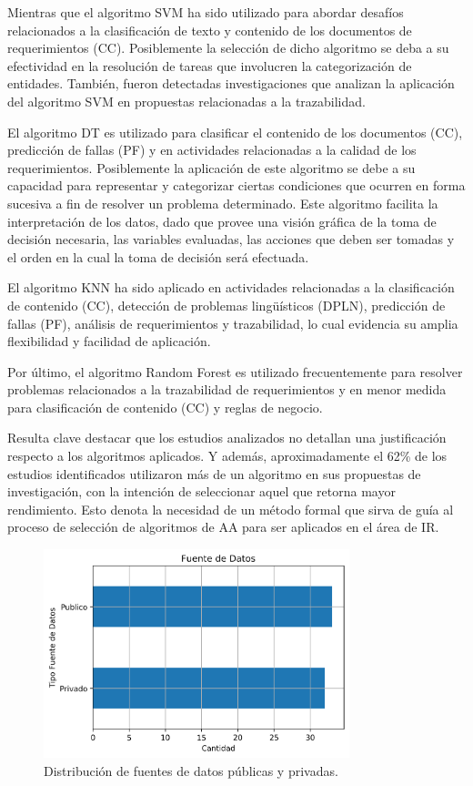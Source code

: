 \documentclass[journal]{IEEEtran}
\begin{document}
Mientras que el algoritmo SVM ha sido utilizado para abordar desafíos relacionados a la clasificación de texto y contenido de los documentos de requerimientos (CC). Posiblemente la selección de dicho algoritmo se deba a su efectividad en la resolución de tareas que involucren la categorización de entidades. También, fueron detectadas investigaciones que analizan la aplicación del algoritmo SVM en propuestas relacionadas a la trazabilidad. 

El algoritmo DT es utilizado para clasificar el contenido de los documentos (CC), predicción de fallas (PF) y en actividades relacionadas a la calidad de los requerimientos. Posiblemente la aplicación de este algoritmo se debe a su capacidad para representar y categorizar ciertas condiciones que ocurren en forma sucesiva a fin de resolver un problema determinado. Este algoritmo facilita la interpretación de los datos, dado que provee una visión gráfica de la toma de decisión necesaria, las variables evaluadas, las acciones que deben ser tomadas y el orden en la cual la toma de decisión será efectuada. 

El algoritmo KNN ha sido aplicado en actividades relacionadas a la clasificación de contenido (CC), detección de problemas lingüísticos (DPLN), predicción de fallas (PF), análisis de requerimientos y trazabilidad, lo cual evidencia su amplia flexibilidad y facilidad de aplicación.

Por último, el algoritmo Random Forest es utilizado frecuentemente para resolver problemas relacionados a la trazabilidad de requerimientos y en menor medida para clasificación de contenido (CC) y reglas de negocio. 

Resulta clave destacar que los estudios analizados no detallan una justificación respecto a los algoritmos aplicados. Y además, aproximadamente el 62\% de los estudios identificados utilizaron más de un algoritmo en sus propuestas de investigación, con la intención de seleccionar aquel que retorna mayor rendimiento. Esto denota la necesidad de un método formal que sirva de guía al proceso de selección de algoritmos de AA para ser aplicados en el área de IR.

\begin{figure}[!t]
\centering
\includegraphics[width=3.5in]{figures/Figure10_Guada.png}
\caption{Distribución de fuentes de datos públicas y privadas.}
\label{fig:11}
\end{figure}
\end{document}
